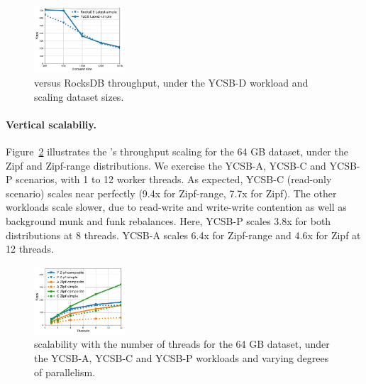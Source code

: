 \begin{figure}[t]
\centering
\includegraphics[width=0.3\textwidth]{figs/Workload_D_line.pdf}
\caption{{\sys\/ versus RocksDB throughput, under the YCSB-D workload and scaling dataset sizes.}}
\label{fig:throughput:d}
\end{figure}

\paragraph{Vertical scalabiliy.} 
Figure~\ref{fig:scalability} illustrates the \sys's throughput scaling for the 64 GB dataset, under the Zipf and Zipf-range 
distributions. We exercise the YCSB-A, YCSB-C and YCSB-P scenarios, with 1 to 12 worker threads.  
As expected, YCSB-C (read-only scenario) scales near perfectly (9.4x for Zipf-range, 7.7x for Zipf). 
The other workloads scale slower, due to read-write and write-write contention as well as background munk and funk rebalances. 
Here, YCSB-P scales 3.8x for both distributions at 8 threads. YCSB-A scales 6.4x for Zipf-range and 4.6x for Zipf
at 12 threads. 

\begin{figure}[th]
\centering
\includegraphics[width=0.3\textwidth]{figs/scalability_line.pdf}
\caption{{\sys\/ scalability with the number of threads for 
the 64 GB dataset, under the YCSB-A, YCSB-C and YCSB-P workloads
and varying degrees of parallelism. }}
\label{fig:scalability}
\end{figure}

